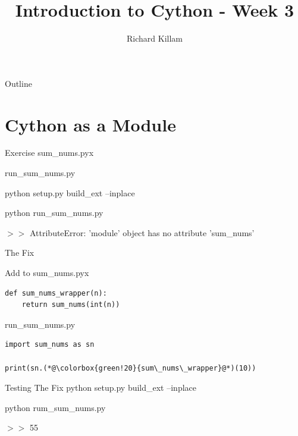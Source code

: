 \documentclass[11pt]{beamer}
\author{Richard Killam}
\title{Introduction to Cython - Week 3}
\begin{document}
\begin{frame}
    \titlepage
\end{frame}

\begin{frame}{Outline}	
	\tableofcontents
\end{frame}

\section{Cython as a Module}
\begin{frame}[fragile]{Exercise}
	sum\_nums.pyx
    \pause
    
\end{frame}

\begin{frame}[fragile]{run\_sum\_nums.py}
    \pause
    

	\vspace{1cm}

    \pause
    python setup.py build\_ext --inplace

    python run\_sum\_nums.py

    \pause
    $>>$ AttributeError: 'module' object has no attribute 'sum\_nums'

\end{frame}

\begin{frame}[fragile]{The Fix}

    Add to sum\_nums.pyx
    \begin{lstlisting}
def sum_nums_wrapper(n):
    return sum_nums(int(n))
    \end{lstlisting}

    \vspace{1cm}

    \pause
    run\_sum\_nums.py
    \begin{lstlisting}
import sum_nums as sn

print(sn.(*@\colorbox{green!20}{sum\_nums\_wrapper}@*)(10))
    \end{lstlisting}
\end{frame}

\begin{frame}[fragile]{Testing The Fix}
    python setup.py build\_ext --inplace

    python rum\_sum\_nums.py

    \pause
    $>>$ 55

\end{frame}
\end{document}
